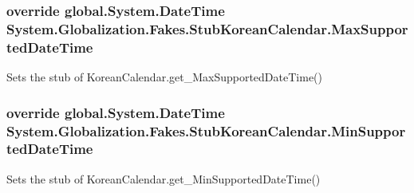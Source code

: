 \hypertarget{class_system_1_1_globalization_1_1_fakes_1_1_stub_korean_calendar_a32d1ce705eef65bc7ba4a0c2aeceae44}{
\subsubsection[{Max\-Supported\-Date\-Time}]{\setlength{\rightskip}{0pt plus 5cm}override global.\-System.\-Date\-Time System.\-Globalization.\-Fakes.\-Stub\-Korean\-Calendar.\-Max\-Supported\-Date\-Time\hspace{0.3cm}{\ttfamily [get]}}}\label{class_system_1_1_globalization_1_1_fakes_1_1_stub_korean_calendar_a32d1ce705eef65bc7ba4a0c2aeceae44}


Sets the stub of Korean\-Calendar.\-get\-\_\-\-Max\-Supported\-Date\-Time()

\hypertarget{class_system_1_1_globalization_1_1_fakes_1_1_stub_korean_calendar_a767c5c988b754562e897378a45a72fa7}{
\subsubsection[{Min\-Supported\-Date\-Time}]{\setlength{\rightskip}{0pt plus 5cm}override global.\-System.\-Date\-Time System.\-Globalization.\-Fakes.\-Stub\-Korean\-Calendar.\-Min\-Supported\-Date\-Time\hspace{0.3cm}{\ttfamily [get]}}}\label{class_system_1_1_globalization_1_1_fakes_1_1_stub_korean_calendar_a767c5c988b754562e897378a45a72fa7}


Sets the stub of Korean\-Calendar.\-get\-\_\-\-Min\-Supported\-Date\-Time()

